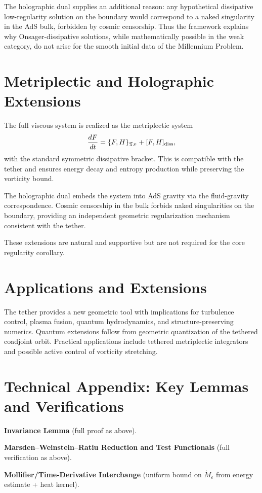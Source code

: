 \documentclass[11pt,a4paper]{article}
\begin{document}
The holographic dual supplies an additional reason: any hypothetical dissipative low-regularity solution on the boundary would correspond to a naked singularity in the AdS bulk, forbidden by cosmic censorship. Thus the framework explains why Onsager-dissipative solutions, while mathematically possible in the weak category, do not arise for the smooth initial data of the Millennium Problem.

\section{Metriplectic and Holographic Extensions}

The full viscous system is realized as the metriplectic system
\[
\frac{dF}{dt} = \{F, H\}_{\mathfrak{T}_F} + [F, H]_{\rm diss},
\]
with the standard symmetric dissipative bracket. This is compatible with the tether and ensures energy decay and entropy production while preserving the vorticity bound.

The holographic dual embeds the system into AdS gravity via the fluid-gravity correspondence. Cosmic censorship in the bulk forbids naked singularities on the boundary, providing an independent geometric regularization mechanism consistent with the tether.

These extensions are natural and supportive but are not required for the core regularity corollary.

\section{Applications and Extensions}

The tether provides a new geometric tool with implications for turbulence control, plasma fusion, quantum hydrodynamics, and structure-preserving numerics. Quantum extensions follow from geometric quantization of the tethered coadjoint orbit. Practical applications include tethered metriplectic integrators and possible active control of vorticity stretching.

\section{Technical Appendix: Key Lemmas and Verifications}

\textbf{Invariance Lemma} (full proof as above).  

\textbf{Marsden--Weinstein--Ratiu Reduction and Test Functionals} (full verification as above).  

\textbf{Mollifier/Time-Derivative Interchange} (uniform bound on \(\dot{M}_\varepsilon\) from energy estimate + heat kernel).  
\end{document}
